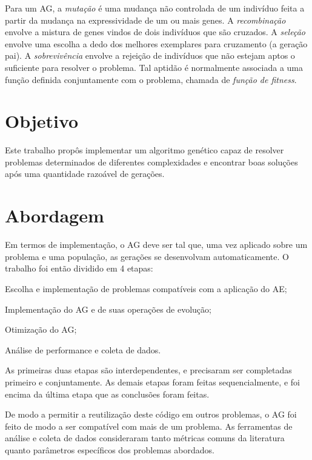 Para um AG, a \emph{mutação} é uma mudança não controlada de um indivíduo feita a partir da mudança na expressividade de um ou mais genes. A \emph{recombinação} envolve a mistura de genes vindos de dois indivíduos que são cruzados. A \emph{seleção} envolve uma escolha a dedo dos melhores exemplares para cruzamento (a geração pai). A \emph{sobrevivência} envolve a rejeição de indivíduos que não estejam aptos o suficiente para resolver o problema. Tal aptidão é normalmente associada a uma função definida conjuntamente com o problema, chamada de \emph{função de fitness}.

\section{Objetivo}

Este trabalho propôs implementar um algoritmo genético capaz de resolver problemas determinados de diferentes complexidades e encontrar boas soluções após uma quantidade razoável de gerações.

\section{Abordagem}

Em termos de implementação, o AG deve ser tal que, uma vez aplicado sobre um problema e uma população, as gerações se desenvolvam automaticamente. O trabalho foi então dividido em 4 etapas:

\begin{enumerate}[label={[\arabic*]}]
	\item Escolha e implementação de problemas compatíveis com a aplicação do AE;
	\item Implementação do AG e de suas operações de evolução;
	\item Otimização do AG;
	\item Análise de performance e coleta de dados.
\end{enumerate}

As primeiras duas etapas são interdependentes, e precisaram ser completadas primeiro e conjuntamente. As demais etapas foram feitas sequencialmente, e foi encima da última etapa que as conclusões foram feitas.

De modo a permitir a reutilização deste código em outros problemas, o AG foi feito de modo a ser compatível com mais de um problema. As ferramentas de análise e coleta de dados consideraram tanto métricas comuns da literatura quanto parâmetros específicos dos problemas abordados.

